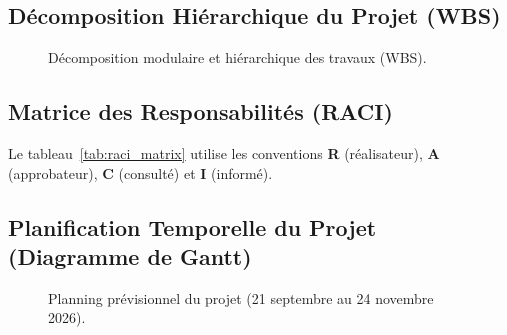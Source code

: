\subsection{Décomposition Hiérarchique du Projet (WBS)}
\begin{figure}[H]
    \centering
    \caption{Décomposition modulaire et hiérarchique des travaux (WBS).}
    \label{fig:wbs_diagram}
\end{figure}

\subsection{Matrice des Responsabilités (RACI)}
Le tableau~\ref{tab:raci_matrix} utilise les conventions \textbf{R} (réalisateur), \textbf{A} (approbateur), \textbf{C} (consulté) et \textbf{I} (informé).

\begin{table}[H]
    \centering
    \caption{Matrice d'attribution des responsabilités (RACI) par lot de travail.}
    \label{tab:raci_matrix}
\end{table}

\subsection{Planification Temporelle du Projet (Diagramme de Gantt)}
\begin{figure}[H]
    \centering
    \caption{Planning prévisionnel du projet (21 septembre au 24 novembre 2026).}
    \label{fig:gantt_diagram}
\end{figure}

